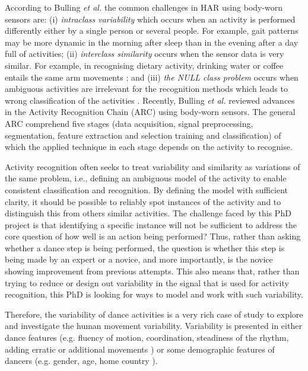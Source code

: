 \documentclass[10pt,journal,compsoc]{IEEEtran}
\begin{document}
According to Bulling \emph{et al.}  \cite{bulling2014} the common challenges in HAR
using body-worn sensors are: 
(i) \textit{intraclass variability} which occurs when an activity is performed differently 
either by a single person or several people. For example, gait patterns may be more
dynamic in the morning after sleep than in the evening after a day full of activities; 
(ii) \textit{interclass similarity} occurs when the sensor data is very similar. For example,
in recognising dietary activity, drinking water or coffee entails the same arm movements 
\cite{amft2008phd};
and (iii) \textit{the NULL class problem} occurs 
when ambiguous activities are irrelevant for the recognition methods
which leads to wrong classification of the activities \cite{amft2011}.
Recently, Bulling \emph{et al.}  \cite{bulling2014} reviewed advances in 
the Activity Recognition Chain (ARC) using body-worn sensors.
The general ARC comprehend five stages (data acquisition, signal preprocessing, 
segmentation, feature extraction and selection training and classification) of which
the applied technique in each stage depends on the activity to recognise.


Activity recognition often seeks to treat variability and similarity as variations
of the same problem, i.e., defining an ambiguous model of the activity to enable consistent
classification and recognition.
By defining the model with sufficient clarity, it should be possible to reliably 
spot instances of the activity and to distinguish this from others similar activities.
The challenge faced by this PhD project is that identifying a specific instance will
not be sufficient to address the core question of how well is an action being performed?
Thus, rather than asking whether a dance step is being performed, the question is
whether this step is being made by an expert or a novice, and more importantly,
is the novice showing improvement from previous attempts.
This also means that, rather than trying to reduce or design out variability in the signal
that is used for activity recognition, this PhD is looking for ways to model and
work with such variability.

Therefore, the variability of dance activities is a very rich case of study 
to explore and investigate the human movement variability.
Variability is presented in either dance features 
(e.g. fluency of motion, coordination, steadiness of the rhythm, 
adding erratic or additional movements \cite{Grammer2011, Aristidou2014}) 
or some demographic features of dancers 
(e.g. gender, age, home country \cite{Grammer2011, Iwai2011}). 
\end{document}
